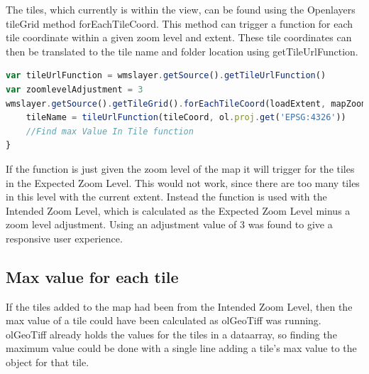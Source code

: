 The tiles, which currently is within the view, can be found using the Openlayers tileGrid method forEachTileCoord. This method can trigger a function for each tile coordinate within a given zoom level and extent. 
\citep{forEachTileCoord}
These tile coordinates can then be translated to the tile name and folder location using getTileUrlFunction.
\begin{lstlisting}[language=JavaScript, caption={Getting the tile name using getTileUrlFunction}, label= VoresJS,escapechar=|]
var tileUrlFunction = wmslayer.getSource().getTileUrlFunction()
var zoomlevelAdjustment = 3
wmslayer.getSource().getTileGrid().forEachTileCoord(loadExtent, mapZoom - zoomlevelAdjustment, function(tileCoord) {
	tileName = tileUrlFunction(tileCoord, ol.proj.get('EPSG:4326'))
	//Find max Value In Tile function
}
\end{lstlisting}
If the function is just given the zoom level of the map it will trigger for the tiles in the Expected Zoom Level. This would not work, since there are too many tiles in this level with the current extent. Instead the function is used with the Intended Zoom Level, which is calculated as the Expected Zoom Level minus a zoom level adjustment. Using an adjustment value of 3 was found to give a responsive user experience.


\subsection{Max value for each tile}
If the tiles added to the map had been from the Intended Zoom Level, then the max value of a tile could have been calculated as olGeoTiff was running. olGeoTiff already holds the values for the tiles in a dataarray, so finding the maximum value could be done with a single line adding a tile's max value to the object for that tile. %


